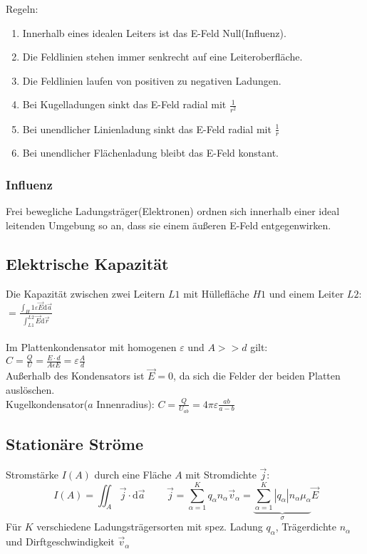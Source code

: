 \documentclass[10pt,a4paper]{scrartcl}
\begin{document}
Regeln:
\begin{enumerate}\itemsep0pt
	\item Innerhalb eines idealen Leiters ist das E-Feld Null(Influenz).
	\item Die Feldlinien stehen immer senkrecht auf eine Leiteroberfläche.
	\item Die Feldlinien laufen von positiven zu negativen Ladungen.
	\item Bei Kugelladungen sinkt das E-Feld radial mit $\frac{1}{r^2}$
	\item Bei unendlicher Linienladung sinkt das E-Feld radial mit $\frac{1}{r}$
	\item Bei unendlicher Flächenladung bleibt das E-Feld konstant.
\end{enumerate}

\subsubsection{Influenz}
Frei bewegliche Ladungsträger(Elektronen) ordnen sich innerhalb einer ideal leitenden Umgebung so an, dass sie einem äußeren E-Feld entgegenwirken.


\subsection{Elektrische Kapazität}
Die Kapazität zwischen zwei Leitern $L1$ mit Hüllefläche $H1$ und einem Leiter $L2$:\\ 
\quad  $=\frac{\int_H1 \varepsilon \vec E \mathrm{d}\vec a}{\int_{L1}^{L2} \vec E \mathrm{d}\vec r}$\\
\\
Im Plattenkondensator mit homogenen $\varepsilon$ und $A>>d$ gilt:\\
$C=\frac{Q}{U}=\frac{E\cdot d}{A\epsilon E}=\varepsilon \frac{A}{d}$\\
Außerhalb des Kondensators ist $\vec E=0$, da sich die Felder der beiden Platten auslöschen.\\
Kugelkondensator($a$ Innenradius): $C=\frac{Q}{U_{ab}}=4\pi\varepsilon\frac{ab}{a-b}$\\




\subsection{Stationäre Ströme}
Stromstärke $I(A)$ durch eine Fläche $A$ mit Stromdichte $\vec j$:
\begin{equation}
	\boxed{\, I(A)=\iint_A \vec j \cdot \mathrm d\vec a \,} \qquad \vec j = \sum_{\alpha = 1}^K q_\alpha n_\alpha \vec v_\alpha=\underbrace{\sum_{\alpha = 1}^K |q_\alpha | n_\alpha \mu_\alpha }_\sigma  \vec E 
\end{equation}
Für $K$ verschiedene Ladungsträgersorten mit spez. Ladung $q_\alpha$, Trägerdichte $n_\alpha$ und Dirftgeschwindigkeit $\vec v_\alpha$\\
\end{document}
